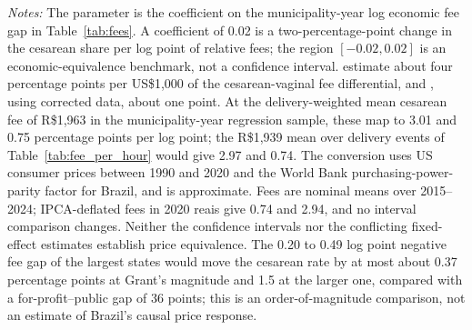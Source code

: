 \begin{table}\centering
\caption{\textbf{Fee-gap coefficients, equivalence, and literature benchmarks}}
\label{tab:feegap_ci}
\small
\small\setlength{\tabcolsep}{4pt}
\begin{minipage}{\linewidth}\footnotesize
\textit{Notes:} The parameter is the coefficient on the municipality-year log economic fee gap in Table~\ref{tab:fees}. A coefficient of 0.02 is a two-percentage-point change in the cesarean share per log point of relative fees; the region $[-0.02, 0.02]$ is an economic-equivalence benchmark, not a confidence interval. \citet{gruber1999physician} estimate about four percentage points per US\$1{,}000 of the cesarean-vaginal fee differential, and \citet{grant2009}, using corrected data, about one point. At the delivery-weighted mean cesarean fee of R\$1,963 in the municipality-year regression sample, these map to 3.01 and 0.75 percentage points per log point; the R\$1,939 mean over delivery events of Table~\ref{tab:fee_per_hour} would give 2.97 and 0.74. The conversion uses US consumer prices between 1990 and 2020 and the World Bank purchasing-power-parity factor for Brazil, and is approximate. Fees are nominal means over 2015--2024; IPCA-deflated fees in 2020 reais give 0.74 and 2.94, and no interval comparison changes. Neither the confidence intervals nor the conflicting fixed-effect estimates establish price equivalence. The 0.20 to 0.49 log point negative fee gap of the largest states would move the cesarean rate by at most about 0.37 percentage points at Grant's magnitude and 1.5 at the larger one, compared with a for-profit--public gap of 36 points; this is an order-of-magnitude comparison, not an estimate of Brazil's causal price response.
\end{minipage}
\end{table}

